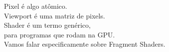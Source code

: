 \documentclass[preview]{standalone}
\begin{document}
Pixel é algo atômico.\\Viewport é uma matriz de pixels.\\Shader é um termo genérico,\\ para programas que rodam na GPU.\\Vamos falar especificamente sobre Fragment Shaders.\\
\end{document}
